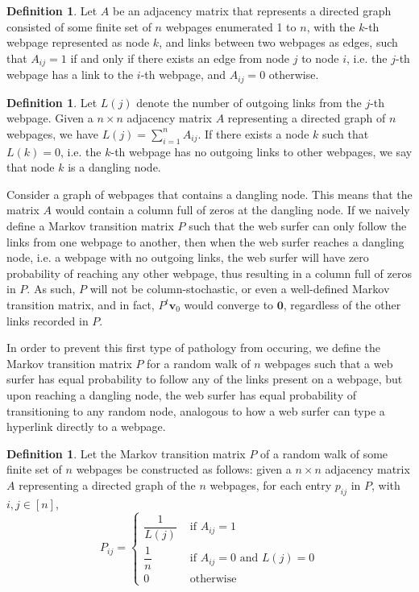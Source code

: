 \documentclass[11pt]{article}
\theoremstyle{definition}
\newtheorem{definition}[theorem]{Definition}
\renewcommand{\vec}[1]{\mathbf{#1}}
\begin{document}
\begin{definition}
    Let $A$ be an adjacency matrix that represents a directed graph consisted of some finite set of $n$ webpages enumerated 1 to $n$,
    with the $k$-th webpage represented as node $k$, and links between two webpages as edges,
    such that $A_{ij} = 1$ if and only if there exists an edge from node $j$ to node $i$, i.e. the $j$-th webpage has a link to the $i$-th webpage, and $A_{ij} = 0$ otherwise.
\end{definition}

\begin{definition}
    Let $L(j)$ denote the number of outgoing links from the $j$-th webpage.
    Given a $n \times n$ adjacency matrix $A$ representing a directed graph of $n$ webpages, 
    we have $L(j) = \sum_{i = 1}^n A_{ij}$.
    If there exists a node $k$ such that $L(k) = 0$, i.e. the $k$-th webpage has no outgoing links to other webpages, we say that node $k$ is a dangling node.
\end{definition}


Consider a graph of webpages that contains a dangling node.
This means that the matrix $A$ would contain a column full of zeros at the dangling node.
If we naively define a Markov transition matrix $P$ such that the web surfer can only follow the links from one webpage to another,
then when the web surfer reaches a dangling node, i.e. a webpage with no outgoing links, the web surfer will have zero probability of reaching any other webpage,
thus resulting in a column full of zeros in $P$.
As such, $P$ will not be column-stochastic, or even a well-defined Markov transition matrix, and in fact,
$P^t \vec{v}_0$ would converge to $\vec{0}$, regardless of the other links recorded in $P$.



In order to prevent this first type of pathology from occuring, we define the Markov transition matrix $P$ for a random walk of $n$ webpages such that
a web surfer has equal probability to follow any of the links present on a webpage,
but upon reaching a dangling node, the web surfer has equal probability of transitioning to any random node, analogous to how a web surfer can type a hyperlink directly to a webpage.

\begin{definition}
    Let the Markov transition matrix $P$ of a random walk of some finite set of $n$ webpages be constructed as follows:
    given a $n \times n$ adjacency matrix $A$ representing a directed graph of the $n$ webpages,
    for each entry $p_{ij}$ in $P$, with $i,j \in [n]$,
    $$ P_{ij} = \begin{cases}
        \dfrac{1}{L(j)} & \text{ if } A_{ij} = 1 \\
        \dfrac{1}{n} & \text{ if } A_{ij} = 0 \text{ and } L(j) = 0 \\
        0 & \text{ otherwise }
    \end{cases}$$
\end{definition}
\end{document}
